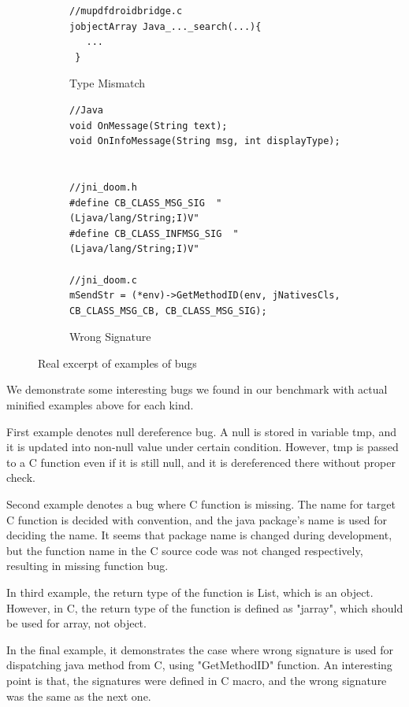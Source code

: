 \begin{figure}[t]
\begin{subfigure}[t]{0.5\textwidth}
\begin{lstlisting}[style=cpp,xleftmargin=2.5em]
//mupdfdroidbridge.c
jobjectArray Java_..._search(...){
   ...
 }
    \end{lstlisting}
    \vspace*{-.5em}
    \caption{Type Mismatch}
    \label{fig:bug3}
  \end{subfigure}
  \begin{subfigure}[t]{0.5\textwidth}
    \begin{lstlisting}[style=cpp,xleftmargin=2.5em]
//Java
void OnMessage(String text);
void OnInfoMessage(String msg, int displayType);


//jni_doom.h
#define CB_CLASS_MSG_SIG  "(Ljava/lang/String;I)V"
#define CB_CLASS_INFMSG_SIG  "(Ljava/lang/String;I)V"

//jni_doom.c
mSendStr = (*env)->GetMethodID(env, jNativesCls, CB_CLASS_MSG_CB, CB_CLASS_MSG_SIG);

    \end{lstlisting}
    \vspace*{-.5em}
    \caption{Wrong Signature}
    \label{fig:bug3}
  \end{subfigure}
  \vspace*{-.5em}
  \caption{Real excerpt of examples of bugs}
  \label{fig:bugs}
\end{figure}

We demonstrate some interesting bugs we found in our benchmark with actual minified examples above
for each kind.

First example denotes null dereference bug. A null is stored in variable tmp, and
it is updated into non-null value under certain condition. However, tmp is passed
to a C function even if it is still null, and it is dereferenced there
without proper check.

Second example denotes a bug where C function is missing. The name for target C
function is decided with convention, and the java package's name is used
for deciding the name. It seems that package name is changed during development,
but the function name in the C source code was not changed respectively, resulting
in missing function bug.

In third example, the return type of the function is List, which is an object.
However, in C, the return type of the function is defined as "jarray", which
should be used for array, not object.

In the final example, it demonstrates the case where wrong signature is used
for dispatching java method from C, using "GetMethodID" function. An interesting
point is that, the signatures were defined in C macro, and the wrong signature
was the same as the next one.

